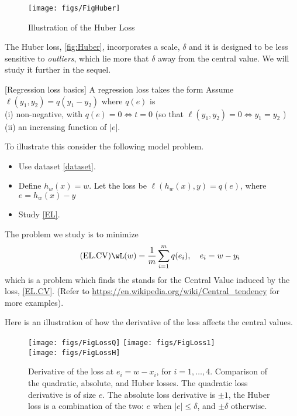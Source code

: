 \documentclass[12pt]{amsart}
\begin{document}
\begin{figure}
  \texttt{[image: figs/FigHuber]}
  \caption{Illustration of the Huber Loss}
  \label{fig:Huber}
\end{figure}


The Huber loss, \autoref{fig:Huber}, incorporates a scale, $\delta$ and it is designed to be less sensitive to \emph{outliers}, which lie more that $\delta$ away from the central value.  We will study it further in the sequel. 



\begin{definition}\label{defn:regression_loss_0}
[Regression loss basics]
A regression loss takes the form 
Assume $\ell(y_1, y_2) = q(y_1 - y_2)$ where $q(e)$ is 
\\ (i) non-negative, with $q(e) = 0 \iff t = 0$ (so that  $\ell(y_1, y_2) = 0 \iff y_1 = y_2$ )
\\ (ii) an increasing function of $|e|$.
\end{definition}

To illustrate this consider the following model problem.

\begin{itemize}
	\item Use dataset \eqref{dataset}.
	\item Define $h_w(x) = w$.   Let the loss be $\ell(h_w(x),y) = q(e)$, where $e = h_w(x)-y$
	\item Study \eqref{EL}. 
\end{itemize}

The problem we study is to minimize 
\begin{equation}\label{EL.CV}\tag{EL.CV}
\wL(w) =  \frac 1 m \sum_{i=1}^m q(e_i), \quad e_i = w-y_i	
\end{equation}
which is a problem which finds the stands for the Central Value induced by the loss, \eqref{EL.CV}.  (Refer to \url{https://en.wikipedia.org/wiki/Central_tendency} for more examples). 

Here is an illustration of how the derivative of the loss affects the central values. 
\begin{figure}
  \texttt{[image: figs/FigLossQ]}
    \texttt{[image: figs/FigLoss1]}\\
      \texttt{[image: figs/FigLossH]}
  \caption{Derivative of the loss at $e_i =  w-x_i$, for $i=1,\dots, 4$. Comparison of the quadratic, absolute, and Huber losses.  The quadratic loss derivative is of size $e$.  The absolute loss derivative is $\pm 1$, the Huber loss is a combination of the two: $e$ when $|e|\leq \delta$, and $\pm \delta$ otherwise. }
  \label{fig:Huber}
\end{figure}
\end{document}
